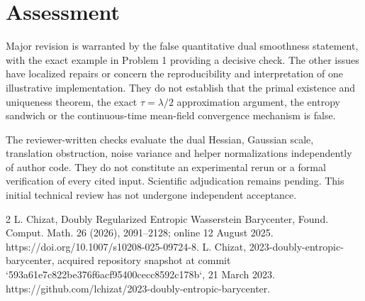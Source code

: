 \documentclass[10pt]{article}
\begin{document}
\section*{Assessment}
Major revision is warranted by the false quantitative dual smoothness statement, with the exact example in Problem 1 providing a decisive check. The other issues have localized repairs or concern the reproducibility and interpretation of one illustrative implementation. They do not establish that the primal existence and uniqueness theorem, the exact \(\tau=\lambda/2\) approximation argument, the entropy sandwich or the continuous-time mean-field convergence mechanism is false.\par
The reviewer-written checks evaluate the dual Hessian, Gaussian scale, translation obstruction, noise variance and helper normalizations independently of author code. They do not constitute an experimental rerun or a formal verification of every cited input. Scientific adjudication remains pending. This initial technical review has not undergone independent acceptance.\par
2 L. Chizat, Doubly Regularized Entropic Wasserstein Barycenter, Found. Comput. Math. 26 (2026), 2091–2128; online 12 August 2025. https://doi.org/10.1007/s10208-025-09724-8. L. Chizat, 2023-doubly-entropic-barycenter, acquired repository snapshot at commit `593a61e7c822be376f6acf95400cecc8592c178b`, 21 March 2023. https://github.com/lchizat/2023-doubly-entropic-barycenter.\par
\end{document}
